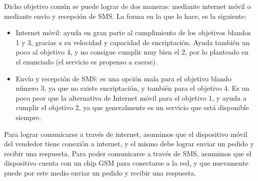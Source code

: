 Dicho objetivo común se puede lograr de dos maneras: mediante internet móvil o mediante envío y recepción de SMS. La forma en la que lo hace, es la siguiente:
\begin{itemize}
	\item Internet móvil: ayuda en gran parte al cumplimiento de los objetivos blandos 1 y 3, gracias a su velocidad y capacidad de encriptación. Ayuda también un poco al objetivo 4, y no consigue cumplir muy bien el 2, por lo planteado en el enunciado (el servicio es propenso a caerse).

	\item Envío y recepción de SMS: es una opción mala para el objetivo blando número 3, ya que no existe encriptación, y también para el objetivo 4. Es un poco peor que la alternativa de Internet móvil para el objetivo 1, y ayuda a cumplir el objetivo 2, ya que generalmente es un servicio que está disponible siempre.
\end{itemize}

\indent Para lograr comunicarse a través de internet, asumimos que el dispositivo móvil del vendedor tiene conexión a internet, y el mismo debe lograr enviar un pedido y recibir una respuesta. Para poder comunicarse a través de SMS, asumimos que el dispositivo cuenta con un chip GSM para conectarse a la red, y que nuevamente puede por este medio enviar un pedido y recibir una respuesta.